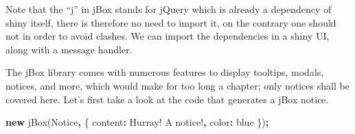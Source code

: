 \documentclass[
]{krantz}
\makeatletter
\newenvironment{Shaded}{\begin{snugshade}}{\end{snugshade}}
\newcommand{\DataTypeTok}[1]{\textcolor[rgb]{0.27,0.27,0.27}{#1}}
\newcommand{\KeywordTok}[1]{\textcolor[rgb]{0.27,0.27,0.27}{\textbf{#1}}}
\newcommand{\NormalTok}[1]{#1}
\newcommand{\OperatorTok}[1]{\textcolor[rgb]{0.43,0.43,0.43}{\textbf{#1}}}
\newcommand{\StringTok}[1]{\textcolor[rgb]{0.5,0.5,0.5}{#1}}
\newenvironment{kframe}{%
\medskip{}
\setlength{\fboxsep}{.8em}
 \def\at@end@of@kframe{}%
 \ifinner\ifhmode%
  \def\at@end@of@kframe{\end{minipage}}%
  \begin{minipage}{\columnwidth}%
 \fi\fi%
 \def\FrameCommand##1{\hskip\@totalleftmargin \hskip-\fboxsep
 \colorbox{shadecolor}{##1}\hskip-\fboxsep
     \hskip-\linewidth \hskip-\@totalleftmargin \hskip\columnwidth}%
 \MakeFramed {\advance\hsize-\width
   \@totalleftmargin\z@ \linewidth\hsize
   \@setminipage}}%
 {\par\unskip\endMakeFramed%
 \at@end@of@kframe}
\renewenvironment{Shaded}{\begin{kframe}}{\end{kframe}}
\makeatother
\begin{document}
Note that the ``j'' in jBox stands for jQuery which is already a dependency of shiny itself, there is therefore no need to import it, on the contrary one should not in order to avoid clashes. We can import the dependencies in a shiny UI, along with a message handler.

\begin{Shaded}
\end{Shaded}

The jBox library comes with numerous features to display tooltips, modals, notices, and more, which would make for too long a chapter; only notices shall be covered here. Let's first take a look at the code that generates a jBox notice.

\begin{Shaded}
\begin{Highlighting}[]
\KeywordTok{new}\NormalTok{ jBox(}\StringTok{\textquotesingle{}Notice\textquotesingle{}}\OperatorTok{,}\NormalTok{ \{}
  \DataTypeTok{content}\OperatorTok{:} \StringTok{\textquotesingle{}Hurray! A notice!\textquotesingle{}}\OperatorTok{,}
  \DataTypeTok{color}\OperatorTok{:} \StringTok{\textquotesingle{}blue\textquotesingle{}}
\NormalTok{\})}\OperatorTok{;}
\end{Highlighting}
\end{Shaded}
\end{document}
